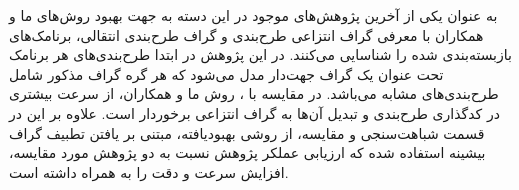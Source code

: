 به عنوان یکی از آخرین پژوهش‌های موجود در این دسته به جهت بهبود روش‌های ما و همکاران  با معرفی گراف انتزاعی طرح‌بندی‌ و گراف طرح‌بندی انتقالی‌، برنامک‌های بازبسته‌بندی شده را شناسایی می‌کنند. در این پژوهش در ابتدا طرح‌بندی‌های هر برنامک تحت عنوان یک گراف جهت‌دار مدل می‌شود که هر گره‌ گراف مذکور شامل طرح‌بندی‌های مشابه می‌باشد. در مقایسه با ، روش ما و همکاران، از سرعت بیشتری در کدگذاری طرح‌بندی و تبدیل آن‌ها به گراف انتزاعی برخوردار است. علاوه بر این در قسمت شباهت‌سنجی و مقایسه، از روشی بهبود‌یافته، مبتنی بر یافتن تطبیف گراف بیشینه‌ استفاده شده که ارزیابی عملکر پژوهش نسبت به دو پژوهش مورد مقایسه، افزایش سرعت و دقت را به همراه داشته است.




